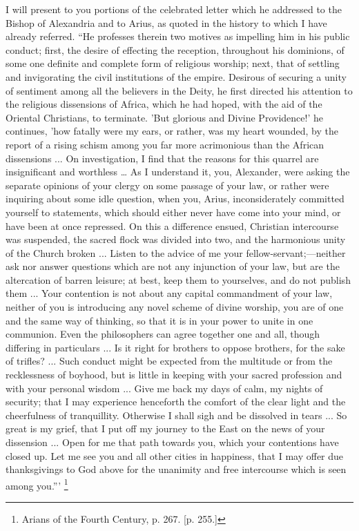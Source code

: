 I will present to you portions of the celebrated letter which he
addressed to the Bishop of Alexandria and to Arius, as quoted in the
history to which I have already referred. ``He professes therein
two motives as impelling him in his public conduct; first, the desire
of effecting the reception, throughout his dominions, of some one
definite and complete form of religious worship; next, that of
settling and invigorating the civil institutions of the empire.
Desirous of securing a unity of sentiment among all the believers in
the Deity, he first directed his attention to the religious
dissensions of Africa, which he had hoped, with the aid of the
Oriental Christians, to terminate. 'But glorious and Divine
Providence!' he continues, 'how fatally were my ears, or rather, was
my heart wounded, by the report of a rising schism among you far more
acrimonious than the African dissensions ... On investigation, I find
that the reasons for this quarrel are insignificant and worthless …
As I understand it, you, Alexander, were asking the separate opinions
of your clergy on some passage of your law, or rather were inquiring
about some idle question, when you, Arius, inconsiderately committed
yourself to statements, which should either never have come into your
mind, or have been at once repressed. On this a difference ensued,
Christian intercourse was suspended, the sacred flock was divided into
two, and the harmonious unity of the Church broken ... Listen to the
advice of me your fellow-servant;—neither ask nor answer questions
which are not any injunction of your law, but are the altercation of
barren leisure; at best, keep them to yourselves, and do not publish
them ... Your contention is not about any capital commandment of your
law, neither of you is introducing any novel scheme of divine worship,
you are of one and the same way of thinking, so that it is in your
power to unite in one communion. Even the philosophers can agree
together one and all, though differing in particulars ... Is it right
for brothers to oppose brothers, for the sake of trifles? ... Such
conduct might be expected from the multitude or from the recklessness
of boyhood, but is little in keeping with your sacred profession and
with your personal wisdom ... Give me back my days of calm, my nights
of security; that I may experience henceforth the comfort of the clear
light and the cheerfulness of tranquillity. Otherwise I shall sigh and
be dissolved in tears ... So great is my grief, that I put off my
journey to the East on the news of your dissension ... Open for me
that path towards you, which your contentions have closed up. Let me
see you and all other cities in happiness, that I may offer due thanksgivings to God above for the unanimity and free intercourse
which is seen among you.''' \footnote{Arians of the Fourth Century, p. 267. [p.
255.]}

